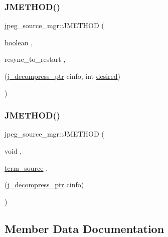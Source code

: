 \subsubsection{\texorpdfstring{JMETHOD()}{JMETHOD()}\hspace{0.1cm}{\footnotesize\ttfamily [4/5]}}
{\footnotesize\ttfamily jpeg\+\_\+source\+\_\+mgr\+::\+J\+M\+E\+T\+H\+OD (\begin{DoxyParamCaption}\item[{\mbox{\hyperlink{jmorecfg_8h_a7c6368b321bd9acd0149b030bb8275ed}{boolean}}}]{,  }\item[{resync\+\_\+to\+\_\+restart}]{,  }\item[{(\mbox{\hyperlink{jpeglib_8h_a00c7d78af44bd26a901c791ccfc1e178}{j\+\_\+decompress\+\_\+ptr}} cinfo, int \mbox{\hyperlink{jpeglib_8h_a3450f7500f843178b4517d0e7ef2b537}{desired}})}]{ }\end{DoxyParamCaption})}

\mbox{\label{structjpeg__source__mgr_a6c0683ce1166b9ee659b2d3aa1efb1c2}} 
\subsubsection{\texorpdfstring{JMETHOD()}{JMETHOD()}\hspace{0.1cm}{\footnotesize\ttfamily [5/5]}}
{\footnotesize\ttfamily jpeg\+\_\+source\+\_\+mgr\+::\+J\+M\+E\+T\+H\+OD (\begin{DoxyParamCaption}\item[{void}]{,  }\item[{\mbox{\hyperlink{jdatasrc_8c_a0337cf4ba81c0f78c48b5de379cca33e}{term\+\_\+source}}}]{,  }\item[{(\mbox{\hyperlink{jpeglib_8h_a00c7d78af44bd26a901c791ccfc1e178}{j\+\_\+decompress\+\_\+ptr}} cinfo)}]{ }\end{DoxyParamCaption})}



\subsection{Member Data Documentation}
\mbox{\label{structjpeg__source__mgr_a8ecb72557c1c9666d77fffea074282a4}} 
